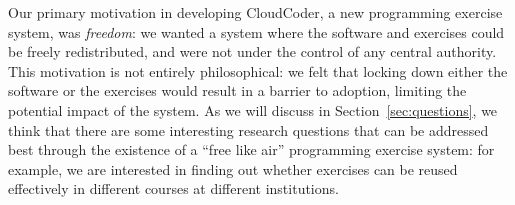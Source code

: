 \documentclass{sig-alternate}
\begin{document}
%
%
%
%

Our primary motivation in developing CloudCoder,
a new programming exercise system,
was {\em freedom}: we wanted a system where
the software and exercises could be freely redistributed, and
were not under the control of any central authority.  This motivation
is not entirely philosophical: we felt that locking down either
the software or the exercises would result in a barrier to adoption,
limiting the potential impact of the system.
As we will discuss in Section~\ref{sec:questions}, we think that there
are some interesting research questions that can be addressed
best through the existence of a ``free like air'' programming
exercise system: for example, we are interested in finding out
whether exercises can be reused effectively in different courses
at different institutions.
\end{document}

